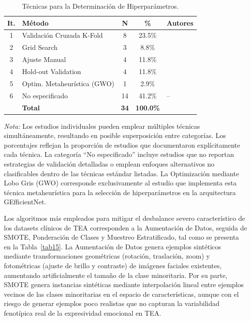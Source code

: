 \documentclass[ASNA,twocolumn]{USG}
\begin{document}
	\begin{table}[!ht]
		\centering
		\caption{Técnicas para la Determinación de Hiperparámetros.\label{tab14}}
		{\setlength{\tabcolsep}{3pt}
			\begin{tabular*}{\columnwidth}{@{\extracolsep\fill}clccl@{\extracolsep\fill}}
				\toprule
				\textbf{It.} & \textbf{Método} & \textbf{N} & \textbf{\%} & \textbf{Autores} \\
				\midrule
				1 & \parbox[t]{2.2cm}{Validación Cruzada K-Fold} & 8  & 23.5\% & \cite{Shaik2025,Ahmad2024,Radocaj2025,Washington2022,Hassan2025,Alam2025,Rhatassi2025,Ramachandran2025} \\[12pt]
				2 & Grid Search                       & 3  & 8.8\%  & \cite{Radocaj2025,Ramachandran2025,AkinBulbul2024} \\
				3 & Ajuste Manual                     & 4  & 11.8\% & \cite{Johnson2025,Sholikah2024,Aljbori2025,Hosney2024} \\
				4 & Hold-out Validation               & 4  & 11.8\% & \cite{Shaik2025,Sariyanidi2025,Cicceri2026,Hwang2024} \\
				5 & \parbox[t]{2.2cm}{Optim. Metaheurística (GWO)} & 1 & 2.9\% & \cite{Ramachandran2025} \\[6pt]
				6 & No especificado                   & 14 & 41.2\% & -- \\
				& \textbf{Total}                    & \textbf{34} & \textbf{100.0\%} & \\
				\bottomrule
		\end{tabular*}}
		\begin{tablenotes}
			\item {\it Nota:} Los estudios individuales pueden emplear múltiples técnicas
			simultáneamente, resultando en posible superposición entre categorías. Los
			porcentajes reflejan la proporción de estudios que documentaron explícitamente cada
			técnica. La categoría ``No especificado'' incluye estudios que no reportan
			estrategias de validación detalladas o emplean enfoques alternativos no
			clasificables dentro de las técnicas estándar listadas. La Optimización mediante
			Lobo Gris (GWO) corresponde exclusivamente al estudio \cite{Ramachandran2025} que
			implementa esta técnica metaheurística para la selección de hiperparámetros en la
			arquitectura GEfficientNet.
		\end{tablenotes}
	\end{table}
	
	Los algoritmos más empleados para mitigar el desbalance severo característico de
	los datasets clínicos de TEA corresponden a la Aumentación de Datos, seguida de
	SMOTE, Ponderación de Clases y Muestreo Estratificado, tal como se presenta en la
	Tabla~\ref{tab15}. La Aumentación de Datos genera ejemplos sintéticos mediante
	transformaciones geométricas (rotación, traslación, zoom) y fotométricas (ajuste
	de brillo y contraste) de imágenes faciales existentes, aumentando artificialmente
	el tamaño de la clase minoritaria. Por su parte, SMOTE genera instancias sintéticas
	mediante interpolación lineal entre ejemplos vecinos de las clases minoritarias en
	el espacio de características, aunque con el riesgo de generar ejemplos poco
	realistas que no capturan la variabilidad fenotípica real de la expresividad
	emocional en TEA.
	
\end{document}
